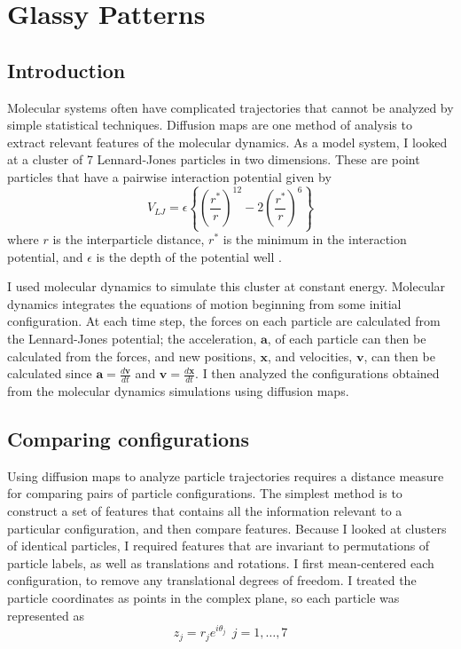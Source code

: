 
\chapter{Glassy Patterns\label{ch:glass}}

\graphicspath{{ch-glass/figures/}}

\section{Introduction}

Molecular systems often have complicated trajectories that cannot be analyzed by simple statistical techniques. Diffusion maps are one method of analysis to extract relevant features of the molecular dynamics. As a model system, I looked at a cluster of 7 Lennard-Jones particles in two dimensions. These are point particles that have a pairwise interaction potential given by
\begin{equation}
\label{LJ}
V_{LJ}=\epsilon\left\{\left(\frac{r^{*}}{r}\right)^{12}-2\left(\frac{r^{*}}{r}\right)^{6}\right\}
\end{equation}
where $r$ is the interparticle distance, $r^{*}$ is the minimum in the interaction potential, and $\epsilon$ is the depth of the potential well \cite{hill2012introduction}.

I used molecular dynamics to simulate this cluster at constant energy. Molecular dynamics integrates the equations of motion beginning from some initial configuration. At each time step, the forces on each particle are calculated from the Lennard-Jones potential; the acceleration, $\mathbf{a}$, of each particle can then be calculated from the forces, and new positions, $\mathbf{x}$, and velocities, $\mathbf{v}$, can then be calculated since $\mathbf{a}=\frac{d\mathbf{v}}{dt}$ and $\mathbf{v}=\frac{d\mathbf{x}}{dt}$. I then analyzed the configurations obtained from the molecular dynamics simulations using diffusion maps. 

\section{Comparing configurations} \label{sec:moments}
Using diffusion maps to analyze particle trajectories requires a distance measure for comparing pairs of particle configurations. The simplest method is to construct a set of features that contains all the information relevant to a particular configuration, and then compare features. Because I looked at clusters of identical particles, I required features that are invariant to permutations of particle labels, as well as translations and rotations. I first mean-centered each configuration, to remove any translational degrees of freedom. I treated the particle coordinates as points in the complex plane, so each particle was represented as
\begin{equation}
z_j=r_{j}e^{i\theta_j} \ \ j=1,\dots,7
\end{equation}

